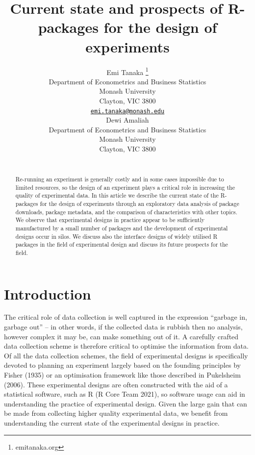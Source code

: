 \documentclass{article}
\title{Current state and prospects of R-packages for the design of
experiments}
\author{
    Emi Tanaka
    \thanks{emitanaka.org}
   \\
    Department of Econometrics and Business Statistics \\
    Monash University \\
  Clayton, VIC 3800 \\
  \texttt{\href{mailto:emi.tanaka@monash.edu}{\nolinkurl{emi.tanaka@monash.edu}}} \\
   \And
    Dewi Amaliah
   \\
    Department of Econometrics and Business Statistics \\
    Monash University \\
  Clayton, VIC 3800 \\
  \texttt{} \\
  }
\begin{document}
\maketitle


\begin{abstract}
Re-running an experiment is generally costly and in some cases
impossible due to limited resources, so the design of an experiment
plays a critical role in increasing the quality of experimental data. In
this article we describe the current state of the R-packages for the
design of experiments through an exploratory data analysis of package
downloads, package metadata, and the comparison of characteristics with
other topics. We observe that experimental designs in practice appear to
be sufficiently manufactured by a small number of packages and the
development of experimental designs occur in silos. We discuss also the
interface designs of widely utilised R packages in the field of
experimental design and discuss its future prospects for the field.
\end{abstract}


\hypertarget{introduction}{%
\section{Introduction}\label{introduction}}

The critical role of data collection is well captured in the expression
``garbage in, garbage out'' -- in other words, if the collected data is
rubbish then no analysis, however complex it may be, can make something
out of it. A carefully crafted data collection scheme is therefore
critical to optimise the information from data. Of all the data
collection schemes, the field of experimental designs is specifically
devoted to planning an experiment largely based on the founding
principles by Fisher (1935) or an optimisation framework like those
described in Pukelsheim (2006). These experimental designs are often
constructed with the aid of a statistical software, such as R (R Core
Team 2021), so software usage can aid in understanding the practice of
experimental design. Given the large gain that can be made from
collecting higher quality experimental data, we benefit from
understanding the current state of the experimental designs in practice.
\end{document}
